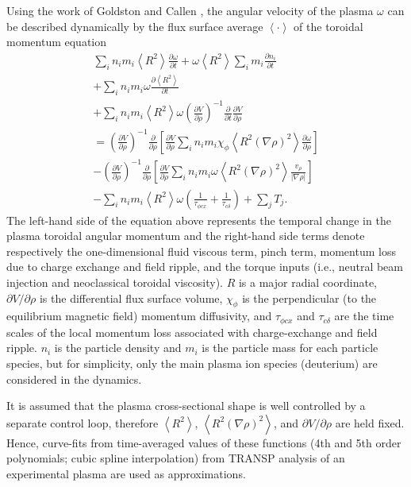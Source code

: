 \documentclass[12pt]{iopart}
\begin{document}
Using the work of Goldston \cite{Goldston86}  and Callen  \cite{Callen09}, the angular velocity of the plasma $\omega$ can be described dynamically by the flux surface average $\left<\cdot\right>$ of the toroidal momentum equation 
\begin{multline}
  \sum_i n_i m_i \left<R^2\right> \frac{\partial \omega}{\partial t}
  + \omega \left<R^2\right> \sum_i m_i \frac{\partial n_i}{\partial t} \\
  + \sum_i n_i m_i \omega \frac{\partial \left<R^2\right>}{\partial t} \\
  + \sum_i n_i m_i \left<R^2\right> \omega \left( \frac{\partial V}{\partial\rho}\right)^{-1} \frac{\partial}{\partial t} \frac{\partial V}{\partial \rho} \\
  = \left( \frac{\partial V}{\partial\rho}\right)^{-1}\frac{\partial}{\partial \rho} \left[\frac{\partial V}{\partial \rho}\sum_i n_i m_i \chi_\phi \left< R^2 (\nabla \rho)^2\right> \frac{\partial\omega}{\partial\rho}\right] \\
  - \left( \frac{\partial V}{\partial\rho}\right)^{-1}\frac{\partial}{\partial \rho} \left[\frac{\partial V}{\partial \rho}\sum_i n_i m_i \omega \left< R^2 (\nabla \rho)^2\right> \frac{v_\rho}{|\nabla\rho|}\right] \\
  - \sum_i n_i m_i \left< R^2\right> \omega \left( \frac{1}{\tau_{\phi cx}} + \frac{1}{\tau_{c\delta}}\right) + \sum_j T_j.
	\label{eq:full1}
\end{multline}
The left-hand side of the equation above represents the temporal change in the plasma toroidal angular momentum and the right-hand side terms denote respectively the one-dimensional fluid viscous term, pinch term, momentum loss due to charge exchange and field ripple, and the torque inputs (i.e., neutral beam injection and neoclassical toroidal viscosity). $R$ is a major radial coordinate, $\partial V/\partial\rho$ is the differential flux surface volume, $\chi_\phi$ is the perpendicular (to the equilibrium magnetic field) momentum diffusivity, and $\tau_{\phi c x}$ and $\tau_{c\delta}$ are the time scales of the local momentum loss associated with charge-exchange and field ripple. $n_i$ is the particle density and $m_i$ is the particle mass for each particle species, but for simplicity, only the main plasma ion species (deuterium) are considered in the dynamics.

It is assumed that the plasma cross-sectional shape is well controlled by a separate control loop, therefore $\left< R^2 \right>$, $\left< R^2 (\nabla\rho)^2 \right>$, and $\partial V/\partial \rho$ are held fixed.  Hence, curve-fits from time-averaged values of these functions (4th and 5th order polynomials; cubic spline interpolation) from TRANSP analysis of an experimental plasma are used as approximations.  
\end{document}
